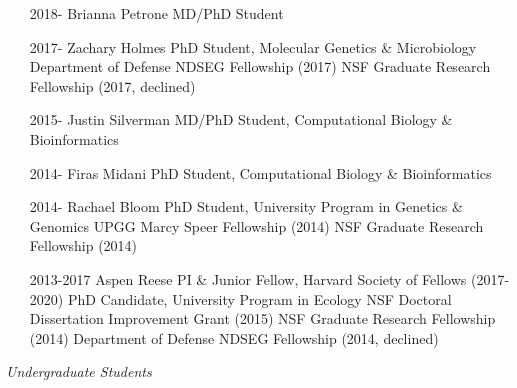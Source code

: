 \documentclass[overlapped,line,11pt]{res}
\begin{document}
\begin{resume}
\begin{itemize}[leftmargin=2cm, style=sameline, itemsep=0mm]
\item[2018-] Brianna Petrone \newline 
  MD/PhD Student
\item[2017-] Zachary Holmes \newline 
  PhD Student, Molecular Genetics \& Microbiology \newline
  Department of Defense NDSEG Fellowship (2017) \newline
  NSF Graduate Research Fellowship (2017, declined)
\item[2015-] Justin Silverman \newline 
  MD/PhD Student, Computational Biology \& Bioinformatics
\item[2014-] Firas Midani \newline 
  PhD Student, Computational Biology \& Bioinformatics
\item[2014-] Rachael Bloom \newline 
  PhD Student, University Program in Genetics \& Genomics \newline
  UPGG Marcy Speer Fellowship (2014) \newline
  NSF Graduate Research Fellowship (2014)
\item[2013-2017] Aspen Reese \newline 
  PI \& Junior Fellow, Harvard Society of Fellows (2017-2020)\newline
  PhD Candidate, University Program in Ecology \newline
  NSF Doctoral Dissertation Improvement Grant (2015) \newline
  NSF Graduate Research Fellowship (2014) \newline
  Department of Defense NDSEG Fellowship (2014, declined)
\end{itemize}

\vspace{-.1in}
\emph{Undergraduate Students}
\vspace{.1in}
\begin{itemize}[leftmargin=2cm, style=sameline, itemsep=0mm]


\end{itemize}
\end{resume}
\end{document}
